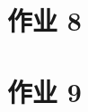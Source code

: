 \documentclass[\ROOT/main.tex]{subfiles}
\begin{document}
\section{作业 8}

\section{作业 9}

\end{document}
